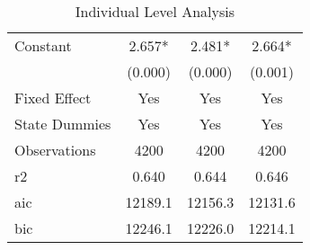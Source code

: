 \begin{table}[]
\begin{tabular}{@{}lccc@{}}
Constant                         & 2.657*     & 2.481*     & 2.664*     \\
                                 & (0.000)    & (0.000)    & (0.001)    \\
Fixed Effect                     & Yes        & Yes        & Yes        \\
State Dummies                    & Yes        & Yes        & Yes        \\
Observations                     & 4200       & 4200       & 4200       \\
r2                               & 0.640      & 0.644      & 0.646      \\
aic                              & 12189.1    & 12156.3    & 12131.6    \\
bic                              & 12246.1    & 12226.0    & 12214.1    \\ \bottomrule
\end{tabular}
\caption{Individual Level Analysis}
\label{reg_ind_all}
\end{table}